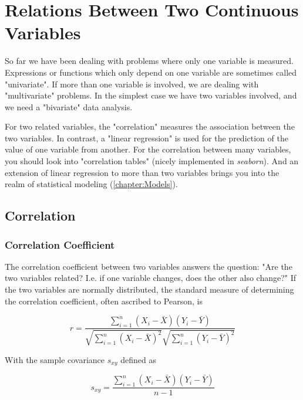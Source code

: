 \chapter{Relations Between Two Continuous Variables}

So far we have been dealing with problems where only one variable is measured. Expressions or functions which only depend on one variable are sometimes called "univariate". If more than one variable is involved, we are dealing with "multivariate" problems. In the simplest case we have two variables involved, and we need a "bivariate" data analysis.

For two related variables, the "correlation" measures the association between the two variables. In contrast, a "linear regression" is used for the prediction of the value of one variable from another. For the correlation between many variables, you should look into "correlation tables" (nicely implemented in \emph{seaborn}).  And an extension of linear regression to more than two variables brings you into the realm of statistical modeling (\ref{chapter:Models}).

\section{Correlation}

\subsection{Correlation Coefficient} 

The \gls{correlation} coefficient between two variables answers the question: "Are the two variables related? I.e. if one variable changes, does the other also change?" If the two variables are normally distributed, the standard measure of determining the correlation coefficient, often ascribed to Pearson, is

\begin{equation}\label{eq:pearson}
  r = \frac{\sum\limits_{i=1}^n (X_i - \bar{X})(Y_i - \bar{Y})}{\sqrt{\sum\limits_{i=1}^n (X_i - \bar{X})^2} \sqrt{\sum\limits_{i=1}^n (Y_i - \bar{Y})^2}}
\end{equation}

With the  sample covariance $s_{xy}$ defined as

\begin{equation}
  s_{xy} = \frac{\sum\limits_{i=1}^n (X_i - \bar{X})(Y_i - \bar{Y})}{n-1}
\end{equation}

